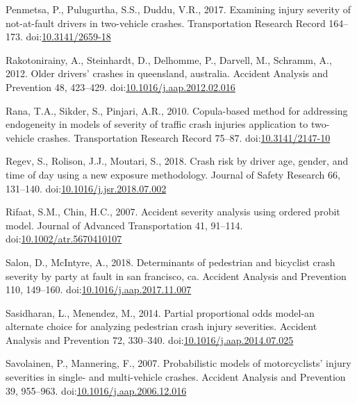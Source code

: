 \documentclass[]{elsarticle} %
\begin{document}
\leavevmode\hypertarget{ref-Penmetsa2017examining}{}%
Penmetsa, P., Pulugurtha, S.S., Duddu, V.R., 2017. Examining injury
severity of not-at-fault drivers in two-vehicle crashes. Transportation
Research Record 164--173.
doi:\href{https://doi.org/10.3141/2659-18}{10.3141/2659-18}

\leavevmode\hypertarget{ref-Rakotonirainy2012older}{}%
Rakotonirainy, A., Steinhardt, D., Delhomme, P., Darvell, M., Schramm,
A., 2012. Older drivers' crashes in queensland, australia. Accident
Analysis and Prevention 48, 423--429.
doi:\href{https://doi.org/10.1016/j.aap.2012.02.016}{10.1016/j.aap.2012.02.016}

\leavevmode\hypertarget{ref-Rana2010copula}{}%
Rana, T.A., Sikder, S., Pinjari, A.R., 2010. Copula-based method for
addressing endogeneity in models of severity of traffic crash injuries
application to two-vehicle crashes. Transportation Research Record
75--87. doi:\href{https://doi.org/10.3141/2147-10}{10.3141/2147-10}

\leavevmode\hypertarget{ref-Regev2018crash}{}%
Regev, S., Rolison, J.J., Moutari, S., 2018. Crash risk by driver age,
gender, and time of day using a new exposure methodology. Journal of
Safety Research 66, 131--140.
doi:\href{https://doi.org/10.1016/j.jsr.2018.07.002}{10.1016/j.jsr.2018.07.002}

\leavevmode\hypertarget{ref-Rifaat2007accident}{}%
Rifaat, S.M., Chin, H.C., 2007. Accident severity analysis using ordered
probit model. Journal of Advanced Transportation 41, 91--114.
doi:\href{https://doi.org/10.1002/atr.5670410107}{10.1002/atr.5670410107}

\leavevmode\hypertarget{ref-Salon2018determinants}{}%
Salon, D., McIntyre, A., 2018. Determinants of pedestrian and bicyclist
crash severity by party at fault in san francisco, ca. Accident Analysis
and Prevention 110, 149--160.
doi:\href{https://doi.org/10.1016/j.aap.2017.11.007}{10.1016/j.aap.2017.11.007}

\leavevmode\hypertarget{ref-Sasidharan2014partial}{}%
Sasidharan, L., Menendez, M., 2014. Partial proportional odds model-an
alternate choice for analyzing pedestrian crash injury severities.
Accident Analysis and Prevention 72, 330--340.
doi:\href{https://doi.org/10.1016/j.aap.2014.07.025}{10.1016/j.aap.2014.07.025}

\leavevmode\hypertarget{ref-Savolainen2007probabilistic}{}%
Savolainen, P., Mannering, F., 2007. Probabilistic models of
motorcyclists' injury severities in single- and multi-vehicle crashes.
Accident Analysis and Prevention 39, 955--963.
doi:\href{https://doi.org/10.1016/j.aap.2006.12.016}{10.1016/j.aap.2006.12.016}
\end{document}
